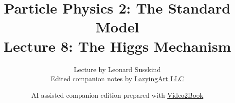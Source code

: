 \documentclass[11pt,oneside]{book}
\begin{document}
\frontmatter
\title{Particle Physics 2: The Standard Model\\Lecture 8: The Higgs Mechanism}
\author{Lecture by Leonard Susskind\\Edited companion notes by \href{https://lazying.art}{LazyingArt LLC}}
\date{AI-assisted companion edition prepared with \href{https://github.com/lachlanchen/Video2Book}{Video2Book}}
\maketitle
\mainmatter

\end{document}
